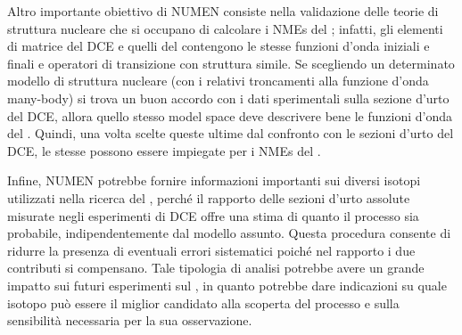 Altro importante obiettivo di NUMEN consiste nella validazione delle teorie di struttura nucleare che si occupano di calcolare i NMEs del \doppiobeta{};
infatti, gli elementi di matrice del DCE e quelli del \doppiobeta{} contengono le stesse funzioni d'onda iniziali e finali e operatori di transizione con struttura simile. Se scegliendo un determinato modello di struttura nucleare (con i relativi troncamenti alla funzione d'onda many-body) si trova un buon accordo con i dati sperimentali sulla sezione d'urto del DCE, allora quello stesso model space deve descrivere bene le funzioni d'onda del \doppiobeta.
Quindi, una volta scelte queste ultime dal confronto con le sezioni d'urto del DCE, le stesse possono essere impiegate per i NMEs del \doppiobeta{}. 

Infine, NUMEN potrebbe fornire informazioni importanti sui diversi isotopi utilizzati nella ricerca del \doppiobeta{}, perché il rapporto delle sezioni d'urto assolute misurate negli esperimenti di DCE offre una stima di quanto il processo sia probabile, indipendentemente dal modello assunto. 
Questa procedura consente di ridurre la presenza di eventuali errori sistematici poiché nel rapporto i due contributi si compensano.
Tale tipologia di analisi potrebbe avere un grande impatto sui futuri esperimenti sul \doppiobeta{}, in quanto potrebbe dare indicazioni su quale isotopo può essere il miglior candidato alla scoperta del processo e sulla sensibilità necessaria per la sua osservazione. 


